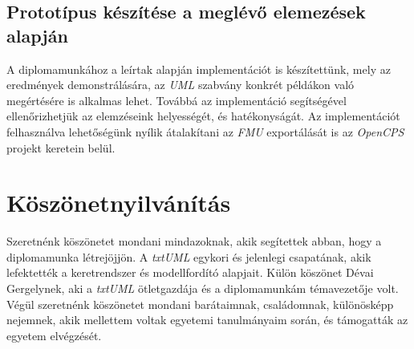 \documentclass[a4paper,12pt]{report}
\begin{document}
\section{Prototípus készítése a meglévő elemezések alapján}
A diplomamunkához a leírtak alapján implementációt is készítettünk, mely az eredmények demonstrálására, az \textit{UML} szabvány konkrét példákon való megértésére is alkalmas lehet. Továbbá az implementáció segítségével ellenőrizhetjük az elemzéseink helyességét, és hatékonyságát. Az implementációt felhasználva lehetőségünk nyílik átalakítani az \textit{FMU} exportálását is az \textit{OpenCPS} projekt keretein belül.


\chapter*{Köszönetnyilvánítás}
Szeretnénk köszönetet mondani mindazoknak, akik segítettek abban, hogy a diplomamunka létrejöjjön. A \textit{txtUML} egykori és jelenlegi csapatának, akik lefektették a keretrendszer és modellfordító alapjait. Külön köszönet Dévai Gergelynek, aki a \textit{txtUML} ötletgazdája és a diplomamunkám témavezetője volt. Végül szeretnénk köszönetet mondani barátaimnak, családomnak, különösképp nejemnek, akik mellettem voltak egyetemi tanulmányaim során, és támogatták az egyetem elvégzését.
\end{document}
